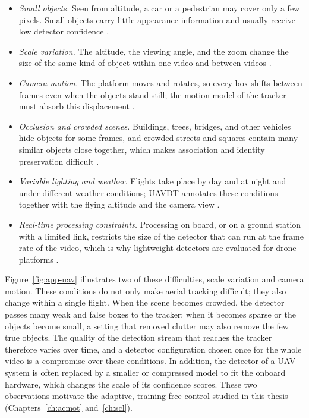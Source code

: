 \begin{itemize}
\item \emph{Small objects.} Seen from altitude, a car or a pedestrian may cover only a few pixels. Small objects carry little appearance information and usually receive low detector confidence \cite{cheng2023smallobject,dai2026lsoyolo}.
\item \emph{Scale variation.} The altitude, the viewing angle, and the zoom change the size of the same kind of object within one video and between videos \cite{du2018uavdt,zhu2022visdrone}.
\item \emph{Camera motion.} The platform moves and rotates, so every box shifts between frames even when the objects stand still; the motion model of the tracker must absorb this displacement \cite{liu2022uavmot}.
\item \emph{Occlusion and crowded scenes.} Buildings, trees, bridges, and other vehicles hide objects for some frames, and crowded streets and squares contain many similar objects close together, which makes association and identity preservation difficult \cite{zhu2022visdrone,li2025motreview}.
\item \emph{Variable lighting and weather.} Flights take place by day and at night and under different weather conditions; UAVDT annotates these conditions together with the flying altitude and the camera view \cite{du2018uavdt}.
\item \emph{Real-time processing constraints.} Processing on board, or on a ground station with a limited link, restricts the size of the detector that can run at the frame rate of the video, which is why lightweight detectors are evaluated for drone platforms \cite{bakirci2025lowpower}.
\end{itemize}
Figure~\ref{fig:app-uav} illustrates two of these difficulties, scale variation and camera motion. These conditions do not only make aerial tracking difficult; they also change within a single flight. When the scene becomes crowded, the detector passes many weak and false boxes to the tracker; when it becomes sparse or the objects become small, a setting that removed clutter may also remove the few true objects. The quality of the detection stream that reaches the tracker therefore varies over time, and a detector configuration chosen once for the whole video is a compromise over these conditions. In addition, the detector of a UAV system is often replaced by a smaller or compressed model to fit the onboard hardware, which changes the scale of its confidence scores. These two observations motivate the adaptive, training-free control studied in this thesis (Chapters~\ref{ch:acmot} and~\ref{ch:scl}).

